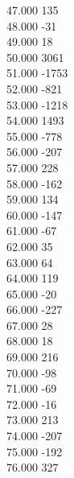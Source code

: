 { 47.000	135 \\
 48.000	-31 \\
 49.000	18 \\
 50.000	3061 \\
 51.000	-1753 \\
 52.000	-821 \\
 53.000	-1218 \\
 54.000	1493 \\
 55.000	-778 \\
 56.000	-207 \\
 57.000	228 \\
 58.000	-162 \\
 59.000	134 \\
 60.000	-147 \\
 61.000	-67 \\
 62.000	35 \\
 63.000	64 \\
 64.000	119 \\
 65.000	-20 \\
 66.000	-227 \\
 67.000	28 \\
 68.000	18 \\
 69.000	216 \\
 70.000	-98 \\
 71.000	-69 \\
 72.000	-16 \\
 73.000	213 \\
 74.000	-207 \\
 75.000	-192 \\
 76.000	327 \\
}
